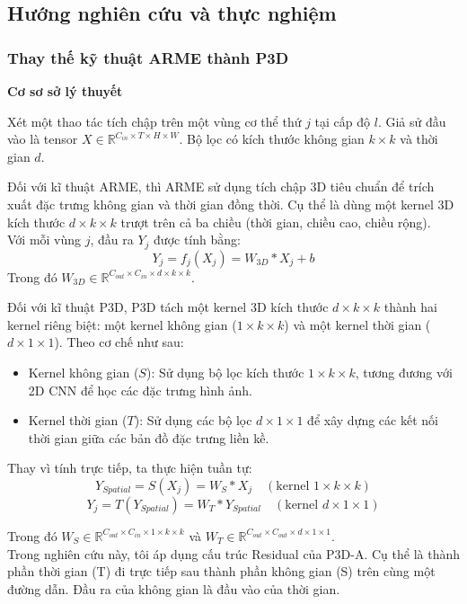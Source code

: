 
\newpage

\subsection{Hướng nghiên cứu và thực nghiệm}


\subsubsection{Thay thế kỹ thuật ARME thành P3D}
\textbf{Cơ sơ sở lý thuyết}

Xét một thao tác tích chập trên một vùng cơ thể thứ $j$ tại cấp độ $l$. Giả sử đầu vào là tensor $X \in \mathbb{R}^{C_{in} \times T \times H \times W}$.
Bộ lọc có kích thước không gian $k \times k$  và thời gian $d$.

Đối với kĩ thuật ARME, thì ARME sử dụng tích chập 3D tiêu chuẩn để trích xuất đặc trưng không gian và thời gian đồng thời.
Cụ thể là dùng một kernel 3D kích thước $d \times k \times k$ trượt trên cả ba chiều (thời gian, chiều cao, chiều rộng).\\
Với mỗi vùng $j$, đầu ra $Y_j$ được tính bằng:$$Y_j = f_j(X_j) = W_{3D} \ast X_j + b$$Trong đó $W_{3D} \in \mathbb{R}^{C_{out} \times C_{in} \times d \times k \times k}$.



Đối với kĩ thuật P3D, P3D tách một kernel 3D kích thước $d \times k \times k$ thành hai kernel riêng biệt: một kernel không gian ($1 \times k \times k$) và một kernel thời gian ($d \times 1 \times 1$).
Theo cơ chế như sau:
\begin{itemize}
    \item Kernel không gian ($S$): Sử dụng bộ lọc kích thước $1 \times k \times k$, tương đương với 2D CNN để học các đặc trưng hình ảnh.
    \item Kernel thời gian ($T$): Sử dụng các bộ lọc $d \times 1 \times 1$ để xây dựng các kết nối thời gian giữa các bản đồ đặc trưng liền kề.
\end{itemize}

Thay vì tính trực tiếp, ta thực hiện tuần tự:
$$Y_{Spatial} = S(X_j) = W_{S} \ast X_j \quad (\text{kernel } 1 \times k \times k)$$
$$Y_{j} = T(Y_{Spatial}) = W_{T} \ast Y_{Spatial} \quad (\text{kernel } d \times 1 \times 1)$$

Trong đó $W_{S} \in \mathbb{R}^{C_{out} \times C_{in} \times 1 \times k \times k}$ và $W_{T} \in \mathbb{R}^{C_{out} \times C_{out} \times d \times 1 \times 1}$.\\
Trong nghiên cứu này, tôi áp dụng cấu trúc Residual của P3D-A. Cụ thể là thành phần thời gian (T) đi trực tiếp sau thành phần không gian (S) trên cùng một đường dẫn. Đầu ra của không gian là đầu vào của thời gian.

